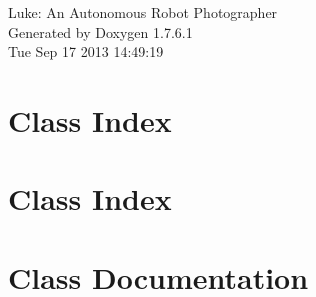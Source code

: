 \documentclass[a4paper]{book}
\begin{document}
\hypersetup{pageanchor=false,citecolor=blue}
\begin{titlepage}
\vspace*{7cm}
\begin{center}
{\Large \-Luke\-: \-An \-Autonomous \-Robot \-Photographer }\\
\vspace*{1cm}
{\large \-Generated by Doxygen 1.7.6.1}\\
\vspace*{0.5cm}
{\small Tue Sep 17 2013 14:49:19}\\
\end{center}
\end{titlepage}
\clearemptydoublepage
{}
\tableofcontents
\clearemptydoublepage
{}
\hypersetup{pageanchor=true,citecolor=blue}
\chapter{\-Class \-Index}

\chapter{\-Class \-Index}

\chapter{\-Class \-Documentation}






























\printindex
\end{document}
